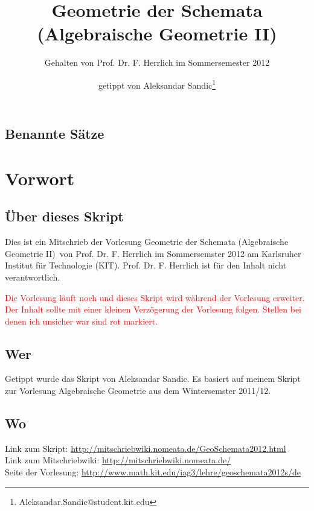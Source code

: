 \documentclass[paper = A4, fontsize=12pt, numbers=noendperiod, chapterprefix=true]{scrbook}
\title{Geometrie der Schemata\\(Algebraische Geometrie II)}
\subtitle{Gehalten von Prof. Dr. F. Herrlich im Sommersemester 2012}
\author{getippt von Aleksandar Sandic\thanks{Aleksandar.Sandic@student.kit.edu}}
\theoremstyle{break}
\theoremstyle{nonumberbreak}
\theoremstyle{nonumberplain}
\begin{document}
\maketitle

\setlength\parskip{0.6pt}
\tableofcontents

\section*{Benannte S\"atze}


\setlength\parskip{\smallskipamount}



\chapter{Vorwort}
\setcounter{secnumdepth}{2}
\section*{\"Uber dieses Skript}
Dies ist ein Mitschrieb der Vorlesung \glqq Geometrie der Schemata (Algebraische Geometrie II)\grqq\ von Prof. Dr. F. Herrlich im Sommersemster 2012 am Karlsruher Institut f\"ur Technologie (KIT). Prof. Dr. F. Herrlich ist f\"ur  den Inhalt nicht verantwortlich.

\textcolor{red}{Die Vorlesung l\"auft noch und dieses Skript wird w\"ahrend der Vorlesung erweiter. Der Inhalt sollte mit einer kleinen Verz\"ogerung der Vorlesung folgen. Stellen bei denen ich unsicher war sind rot markiert.}
\section*{Wer}
Getippt wurde das Skript von Aleksandar Sandic. Es basiert auf meinem Skript zur Vorlesung Algebraische Geometrie aus dem Wintersemster 2011/12.

\section*{Wo}
Link zum Skript: \url{http://mitschriebwiki.nomeata.de/GeoSchemata2012.html}\\
Link zum Mitschriebwiki: \url{http://mitschriebwiki.nomeata.de/}\\
Seite der Vorlesung: \url{http://www.math.kit.edu/iag3/lehre/geoschemata2012s/de}
\end{document}
